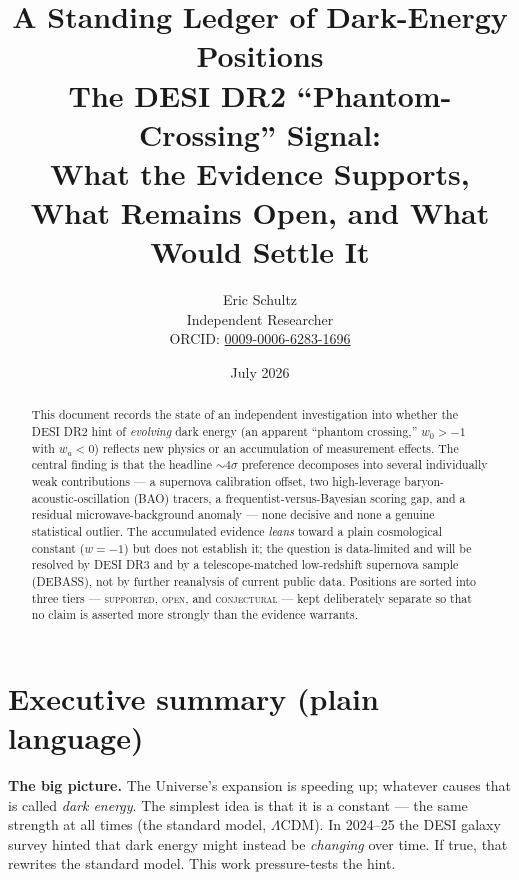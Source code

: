 \documentclass[11pt]{article}
\title{\vspace{-2em}\textbf{A Standing Ledger of Dark-Energy Positions}\\[0.3em]
\large The DESI DR2 ``Phantom-Crossing'' Signal:\\ What the Evidence Supports, What Remains Open, and What Would Settle It}
\author{Eric Schultz\\[0.2em]
\normalsize Independent Researcher\\[0.2em]
\normalsize ORCID: \href{https://orcid.org/0009-0006-6283-1696}{0009-0006-6283-1696}}
\date{July 2026}
\newcommand{\LCDM}{$\Lambda$CDM}
\newcommand{\wo}{\ensuremath{w_0}}
\newcommand{\wa}{\ensuremath{w_a}}
\begin{document}
\maketitle
\thispagestyle{fancy}

\begin{abstract}
\noindent This document records the state of an independent investigation into whether the DESI DR2 hint of \emph{evolving} dark energy (an apparent ``phantom crossing,'' $\wo>-1$ with $\wa<0$) reflects new physics or an accumulation of measurement effects. The central finding is that the headline $\sim\!4\sigma$ preference decomposes into several individually weak contributions --- a supernova calibration offset, two high-leverage baryon-acoustic-oscillation (BAO) tracers, a frequentist-versus-Bayesian scoring gap, and a residual microwave-background anomaly --- none decisive and none a genuine statistical outlier. The accumulated evidence \emph{leans} toward a plain cosmological constant ($w=-1$) but does not establish it; the question is data-limited and will be resolved by DESI DR3 and by a telescope-matched low-redshift supernova sample (DEBASS), not by further reanalysis of current public data. Positions are sorted into three tiers --- \textsc{supported}, \textsc{open}, and \textsc{conjectural} --- kept deliberately separate so that no claim is asserted more strongly than the evidence warrants.
\end{abstract}

\section*{Executive summary (plain language)}

\textbf{The big picture.} The Universe's expansion is speeding up; whatever causes that is called \emph{dark energy}. The simplest idea is that it is a constant --- the same strength at all times (the standard model, \LCDM). In 2024--25 the DESI galaxy survey hinted that dark energy might instead be \emph{changing} over time. If true, that rewrites the standard model. This work pressure-tests the hint.
\end{document}
